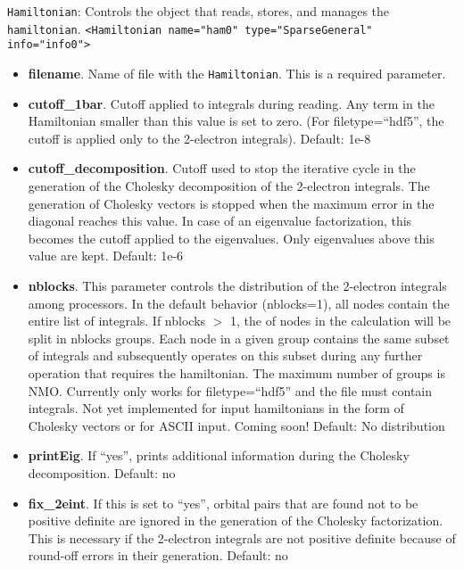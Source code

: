 \texttt{Hamiltonian}: Controls the object that reads, stores, and manages the \texttt{hamiltonian}. 
  \texttt{<Hamiltonian name="ham0" type="SparseGeneral" info="info0">}
\begin{itemize}
\item \textbf{filename}. Name of file with the \texttt{Hamiltonian}. This is a required parameter.
\item \textbf{cutoff\_1bar}. Cutoff applied to integrals during reading. Any term in the Hamiltonian smaller than this value is set to zero. (For filetype=``hdf5'', the cutoff is applied only to the 2-electron integrals). Default: 1e-8
\item \textbf{cutoff\_decomposition}. Cutoff used to stop the iterative cycle in the generation of the Cholesky decomposition of the 2-electron integrals. The generation of Cholesky vectors is stopped when the maximum error in the diagonal reaches this value. In case of an eigenvalue factorization, this becomes the cutoff applied to the eigenvalues. Only eigenvalues above this value are kept. Default: 1e-6
\item \textbf{nblocks}. This parameter controls the distribution of the 2-electron integrals among processors. In the default behavior (nblocks=1), all nodes contain the entire list of integrals. If nblocks $>$ 1, the of nodes in the calculation will be split in nblocks groups. Each node in a given group contains the same subset of integrals and subsequently operates on this subset during  any further operation that requires the hamiltonian. The maximum number of groups is NMO. Currently only works for filetype=``hdf5'' and the file must contain integrals.  Not yet implemented for input hamiltonians in the form of Cholesky vectors or for ASCII input. Coming soon!
    Default: No distribution
\item \textbf{printEig}. If ``yes'', prints additional information during the Cholesky decomposition.
    Default: no
\item \textbf{fix\_2eint}.  If this is set to ``yes'', orbital pairs that are found not to be positive definite are ignored in the generation of the Cholesky factorization. This is necessary if the 2-electron integrals are not positive definite because of round-off errors in their generation.
    Default: no \\
\end{itemize}


